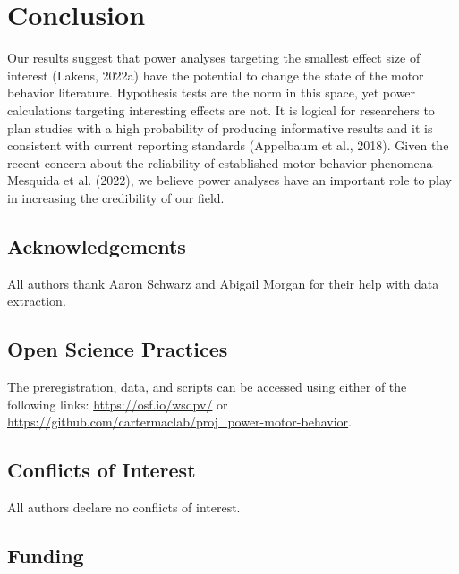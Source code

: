 \documentclass[
  man, donotrepeattitle,mask,floatsintext]{apa7}
\begin{document}
\hypertarget{conclusion}{%
\section{Conclusion}\label{conclusion}}

Our results suggest that power analyses targeting the smallest effect size of interest (Lakens, 2022a) have the potential to change the state of the motor behavior literature. Hypothesis tests are the norm in this space, yet power calculations targeting interesting effects are not. It is logical for researchers to plan studies with a high probability of producing informative results and it is consistent with current reporting standards (Appelbaum et al., 2018). Given the recent concern about the reliability of established motor behavior phenomena Mesquida et al. (2022), we believe power analyses have an important role to play in increasing the credibility of our field.

\vspace{5ex}

\hypertarget{acknowledgements}{%
\subsection{Acknowledgements}\label{acknowledgements}}

\noindent All authors thank Aaron Schwarz and Abigail Morgan for their help with data extraction.

\hypertarget{open-science-practices}{%
\subsection{Open Science Practices}\label{open-science-practices}}

\noindent The preregistration, data, and scripts can be accessed using either of the following links: \url{https://osf.io/wsdpv/} or \url{https://github.com/cartermaclab/proj_power-motor-behavior}.

\hypertarget{conflicts-of-interest}{%
\subsection{Conflicts of Interest}\label{conflicts-of-interest}}

\noindent All authors declare no conflicts of interest.

\hypertarget{funding}{%
\subsection{Funding}\label{funding}}
\end{document}
